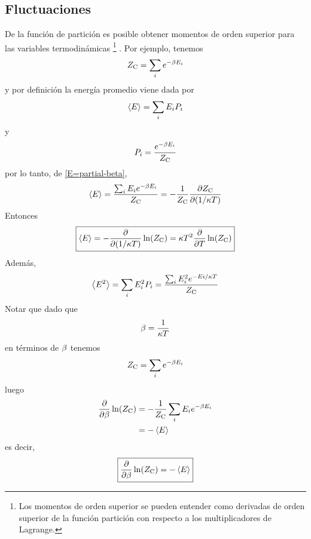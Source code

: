 \subsection{Fluctuaciones}
De la función de partición es posible obtener momentos de orden superior para las variables termodinámicas \footnote{Los momentos de orden superior se pueden entender como derivadas de orden superior de la función partición con respecto a los multiplicadores de Lagrange.} . Por ejemplo, tenemos
\begin{equation}
  Z_{\rm C}=\sum_i e^{-\beta E_i}
\end{equation}
y por definición la energía promedio viene dada por
\begin{equation}
  \ev{E}=\sumi E_iP_i
\end{equation}
y
\begin{equation}
  P_i=\frac{e^{-\beta E_i}}{Z_{\rm C}}
\end{equation}
por lo tanto, de \eqref{E=partial-beta},
\begin{equation}
  \ev{E}=\frac{\sumi E_i e^{-\b E_i}}{\zc}=-\frac{1}{\zc}\pdv{\zc}{(1/\k T)}
\end{equation}
Entonces
\begin{equation}
  \boxed{\ev{E}=-\pdv{(1/\k T)}\ln (\zc)=\k T^2\pdv{T}\ln (\zc)}
\end{equation}
Además,
\begin{equation}
  \ev{E^2}=\sumi E_i^2 P_i=\frac{\sumi E_i^2 e^{-Ei/\k T}}{\zc}
\end{equation}
Notar que dado que
\begin{equation}
  \beta=\frac{1}{\kappa T}
\end{equation}
en términos de $\beta$ tenemos
\begin{equation}
  Z_{\rm C}=\sum_i e^{-\beta E_i}
\end{equation}
luego
\begin{align}
  \pdv{\b}\ln (\zc)&=-\frac{1}{\zc}\sumi E_i\eb\\
  &=-\ev{E}
\end{align}
es decir,
\begin{equation}
  \boxed{\pdv{\b}\ln (\zc)=-\ev{E}}
\end{equation}

